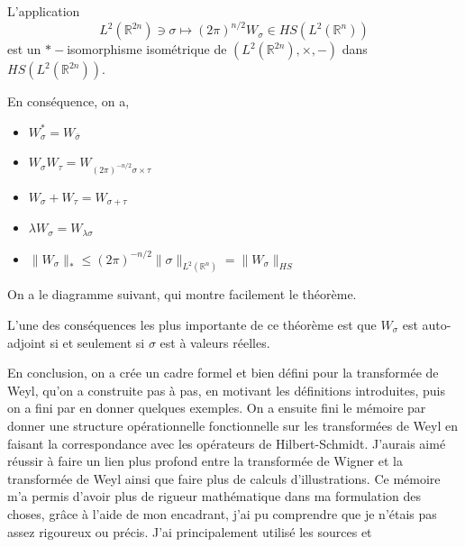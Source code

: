 \documentclass[a4paper, 12pt]{report}
\newcommand{\R}{\mathbb{R}} %
\renewcommand{\.}{\cdot} %
\theoremstyle{break}
\theoremstyle{remark}
\theoremstyle{proofstyle}
\begin{document}
\begin{theorem}
    L'application
    $$L^2(\R^{2n}) \ni \sigma \mapsto (2 \pi)^{n/2} W_\sigma \in HS(L^2(\R^n))$$ est un $*-$isomorphisme isométrique de $(L^2(\R^{2n}), \times, -)$ dans $HS(L^2(\R^{2n}))$. \vspace{5pt}

    En conséquence, on a,
    \begin{itemize}
        \item $W_\sigma^* = W_{\bar{\sigma}}$
        \item $W_\sigma W_\tau = W_{(2 \pi)^{-n/2} \sigma \times \tau}$
        \item $W_\sigma + W_\tau = W_{\sigma+\tau}$
        \item $\lambda W_\sigma = W_{\lambda \sigma}$
        \item $\|W_\sigma\|_* \leq (2 \pi)^{-n/2} \|\sigma\|_{L^2(\R^n)} = \|W_\sigma\|_{HS}$
    \end{itemize}
\end{theorem}

\begin{preuve}
    On a le diagramme suivant, qui montre facilement le théorème.

    \begin{center}
    \end{center}
\end{preuve}

L'une des conséquences les plus importante de ce théorème est que $W_\sigma$ est auto-adjoint si et seulement si $\sigma$ est à valeurs réelles. \vspace{10pt}

En conclusion, on a crée un cadre formel et bien défini pour la transformée de Weyl, qu'on a construite pas à pas, en motivant les définitions introduites, puis on a fini par en donner quelques exemples. On a ensuite fini le mémoire par donner une structure opérationnelle fonctionnelle sur les transformées de Weyl en faisant la correspondance avec les opérateurs de Hilbert-Schmidt. J'aurais aimé réussir à faire un lien plus profond entre la transformée de Wigner et la transformée de Weyl ainsi que faire plus de calculs d'illustrations. Ce mémoire m'a permis d'avoir plus de rigueur mathématique dans ma formulation des choses, grâce à l'aide de mon encadrant, j'ai pu comprendre que je n'étais pas assez rigoureux ou précis. J'ai principalement utilisé les sources \cite{weyl} et \cite{folland}

\printbibliography
\end{document}
